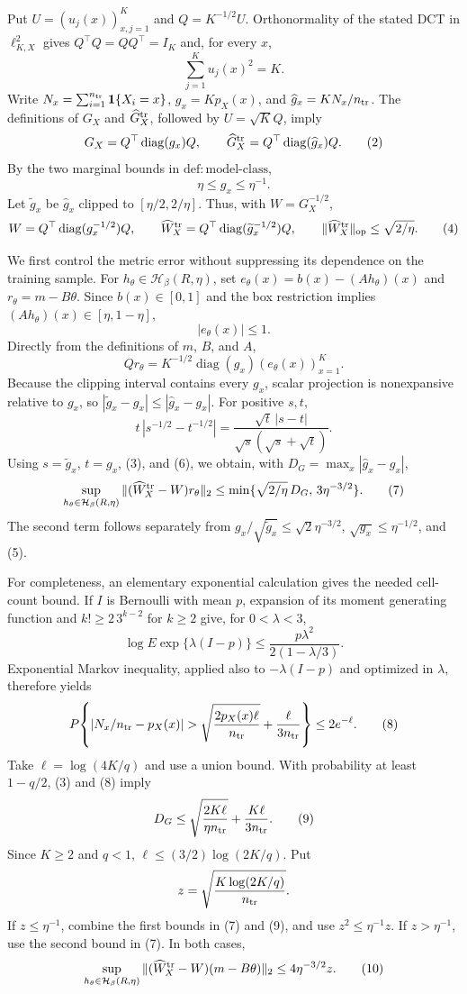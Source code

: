 Put \(U=(u_j(x))_{x,j=1}^K\) and \(Q=K^{-1/2}U\).  Orthonormality of the stated DCT in \(\ell^2_{K,X}\) gives \(Q^\top Q=Q Q^\top=I_K\) and, for every \(x\),
\[
 \sum_{j=1}^K u_j(x)^2=K. \tag{1}
\]
Write \(N_x=\sum_{i=1}^{n_{\rm tr}}\mathbf 1\{X_i=x\}\), \(g_x=Kp_X(x)\), and \(\widehat g_x=KN_x/n_{\rm tr}\).  The definitions of \(G_X\) and \(\widehat G_X^{\rm tr}\), followed by \(U=\sqrt KQ\), imply
\[
 G_X=Q^\top\operatorname{diag}(g_x)Q,
 \qquad
 \widehat G_X^{\rm tr}=Q^\top\operatorname{diag}(\widehat g_x)Q. \tag{2}
\]
By the two marginal bounds in \(\mathrm{def:model\mbox{-}class}\),
\[
 \eta\le g_x\le \eta^{-1}. \tag{3}
\]
Let \(\widetilde g_x\) be \(\widehat g_x\) clipped to \([\eta/2,2/\eta]\).  Thus, with \(W=G_X^{-1/2}\),
\[
 W=Q^\top\operatorname{diag}(g_x^{-1/2})Q,
 \qquad
 \widehat W_X^{\rm tr}=Q^\top\operatorname{diag}(\widetilde g_x^{-1/2})Q,
 \qquad
 \|\widehat W_X^{\rm tr}\|_{\rm op}\le \sqrt{2/\eta}. \tag{4}
\]

We first control the metric error without suppressing its dependence on the training sample.  For \(h_\theta\in\mathcal H_\beta(R,\eta)\), set \(e_\theta(x)=b(x)-(Ah_\theta)(x)\) and \(r_\theta=m-B\theta\).  Since \(b(x)\in[0,1]\) and the box restriction implies \((Ah_\theta)(x)\in[\eta,1-\eta]\),
\[
 |e_\theta(x)|\le1. \tag{5}
\]
Directly from the definitions of \(m\), \(B\), and \(A\),
\[
 Qr_\theta=K^{-1/2}\operatorname{diag}(g_x)(e_\theta(x))_{x=1}^K. \tag{6}
\]
Because the clipping interval contains every \(g_x\), scalar projection is nonexpansive relative to \(g_x\), so \(|\widetilde g_x-g_x|\le|\widehat g_x-g_x|\).  For positive \(s,t\),
\[
 t\,|s^{-1/2}-t^{-1/2}|
 =\frac{\sqrt t\,|s-t|}{\sqrt s(\sqrt s+\sqrt t)}.
\]
Using \(s=\widetilde g_x\), \(t=g_x\), (3), and (6), we obtain, with \(D_G=\max_x|\widehat g_x-g_x|\),
\[
 \sup_{h_\theta\in\mathcal H_\beta(R,\eta)}
 \|(\widehat W_X^{\rm tr}-W)r_\theta\|_2
 \le \min\{\sqrt{2/\eta}\,D_G,\,3\eta^{-3/2}\}. \tag{7}
\]
The second term follows separately from \(g_x/\sqrt{\widetilde g_x}\le\sqrt2\eta^{-3/2}\), \(\sqrt{g_x}\le\eta^{-1/2}\), and (5).

For completeness, an elementary exponential calculation gives the needed cell-count bound.  If \(I\) is Bernoulli with mean \(p\), expansion of its moment generating function and \(k!\ge2\,3^{k-2}\) for \(k\ge2\) give, for \(0<\lambda<3\),
\[
 \log E\exp\{\lambda(I-p)\}
 \le \frac{p\lambda^2}{2(1-\lambda/3)}.
\]
Exponential Markov inequality, applied also to \(-\lambda(I-p)\) and optimized in \(\lambda\), therefore yields
\[
 P\!\left\{|N_x/n_{\rm tr}-p_X(x)|>
 \sqrt{\frac{2p_X(x)\ell}{n_{\rm tr}}}+\frac{\ell}{3n_{\rm tr}}\right\}
 \le2e^{-\ell}. \tag{8}
\]
Take \(\ell=\log(4K/q)\) and use a union bound.  With probability at least \(1-q/2\), (3) and (8) imply
\[
 D_G\le \sqrt{\frac{2K\ell}{\eta n_{\rm tr}}}+\frac{K\ell}{3n_{\rm tr}}. \tag{9}
\]
Since \(K\ge2\) and \(q<1\), \(\ell\le(3/2)\log(2K/q)\).  Put
\[
 z=\sqrt{\frac{K\log(2K/q)}{n_{\rm tr}}}.
\]
If \(z\le\eta^{-1}\), combine the first bounds in (7) and (9), and use \(z^2\le\eta^{-1}z\).  If \(z>\eta^{-1}\), use the second bound in (7).  In both cases,
\[
 \sup_{h_\theta\in\mathcal H_\beta(R,\eta)}
 \|(\widehat W_X^{\rm tr}-W)(m-B\theta)\|_2
 \le4\eta^{-3/2}z. \tag{10}
\]

